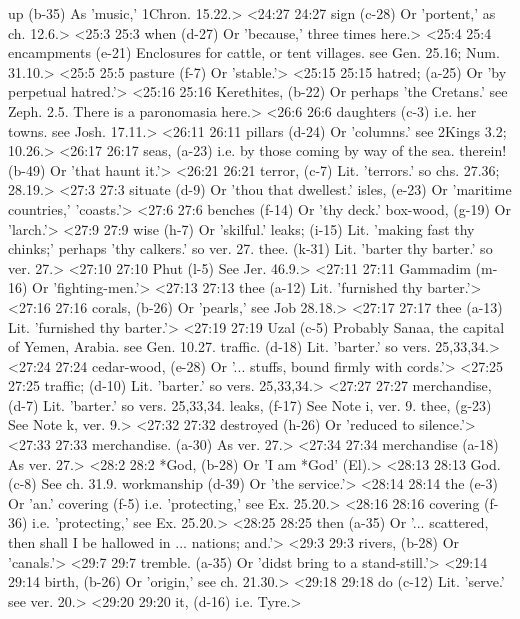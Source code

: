   up (b-35)  As 'music,' 1Chron. 15.22.>
<24:27 24:27  sign (c-28)  Or 'portent,' as ch. 12.6.>
<25:3 25:3  when (d-27)  Or 'because,' three times here.>
<25:4 25:4  encampments (e-21)  Enclosures for cattle, or tent villages. see Gen. 25.16; Num. 31.10.>
<25:5 25:5  pasture (f-7)  Or 'stable.'>
<25:15 25:15  hatred; (a-25)  Or 'by perpetual hatred.'>
<25:16 25:16  Kerethites, (b-22)  Or perhaps 'the Cretans.' see Zeph. 2.5. There is a  paronomasia here.>
<26:6 26:6  daughters (c-3)  i.e. her towns. see Josh. 17.11.>
<26:11 26:11  pillars (d-24)  Or 'columns.' see 2Kings 3.2; 10.26.>
<26:17 26:17  seas, (a-23)  i.e. by those coming by way of the sea.
  therein! (b-49)  Or 'that haunt it.'>
<26:21 26:21  terror, (c-7)  Lit. 'terrors.' so chs. 27.36; 28.19.>
<27:3 27:3  situate (d-9)  Or 'thou that dwellest.'
  isles, (e-23)  Or 'maritime countries,' 'coasts.'>
<27:6 27:6  benches (f-14)  Or 'thy deck.'
  box-wood, (g-19)  Or 'larch.'>
<27:9 27:9  wise (h-7)  Or 'skilful.'
  leaks; (i-15)  Lit. 'making fast thy chinks;' perhaps 'thy calkers.' so ver. 27.
  thee. (k-31)  Lit. 'barter thy barter.' so ver. 27.>
<27:10 27:10  Phut (l-5)  See Jer. 46.9.>
<27:11 27:11  Gammadim (m-16)  Or 'fighting-men.'>
<27:13 27:13  thee (a-12) Lit. 'furnished thy barter.'>
<27:16 27:16  corals, (b-26)  Or 'pearls,' see Job 28.18.>
<27:17 27:17  thee (a-13)  Lit. 'furnished thy barter.'>
<27:19 27:19  Uzal (c-5)  Probably Sanaa, the capital of Yemen, Arabia. see Gen. 10.27.
  traffic. (d-18)  Lit. 'barter.' so vers. 25,33,34.>
<27:24 27:24  cedar-wood, (e-28)  Or '... stuffs, bound firmly with cords.'>
<27:25 27:25  traffic; (d-10)  Lit. 'barter.' so vers. 25,33,34.>
<27:27 27:27  merchandise, (d-7)  Lit. 'barter.' so vers. 25,33,34.
  leaks, (f-17)  See Note i, ver. 9.
  thee, (g-23)  See Note k, ver. 9.>
<27:32 27:32  destroyed (h-26)  Or 'reduced to silence.'>
<27:33 27:33  merchandise. (a-30) As ver. 27.>
<27:34 27:34  merchandise (a-18)  As ver. 27.>
<28:2 28:2  *God, (b-28)  Or 'I am *God' (El).>
<28:13 28:13  God. (c-8)  See ch. 31.9.
  workmanship (d-39)  Or 'the service.'>
<28:14 28:14  the (e-3)  Or 'an.'
  covering (f-5) i.e. 'protecting,' see Ex. 25.20.>
<28:16 28:16  covering (f-36)  i.e. 'protecting,' see Ex. 25.20.>
<28:25 28:25  then (a-35)  Or '... scattered, then shall I be hallowed in ... nations;  and.'>
<29:3 29:3  rivers, (b-28)  Or 'canals.'>
<29:7 29:7  tremble. (a-35)  Or 'didst bring to a stand-still.'>
<29:14 29:14  birth, (b-26)  Or 'origin,' see ch. 21.30.>
<29:18 29:18  do (c-12)  Lit. 'serve.' see ver. 20.>
<29:20 29:20  it, (d-16)  i.e. Tyre.>
